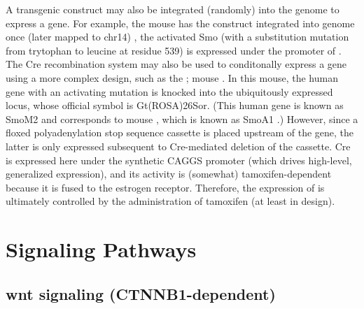 A transgenic construct may also be integrated (randomly) into the genome to express a gene. For example, the  mouse has the  construct integrated into genome once (later mapped to chr14) , the activated Smo (with a substitution mutation from trytophan to leucine at residue 539) is expressed under the promoter of . The Cre recombination system may also be used to conditonally express a gene using a more complex design, such as the ; mouse . In this mouse, the human  gene with an activating  mutation is knocked into the ubiquitously expressed  locus, whose official symbol is Gt(ROSA)26Sor. (This human  gene is known as SmoM2  and corresponds to mouse , which is known as SmoA1 .) However, since a floxed polyadenylation stop sequence cassette is placed upstream of the  gene, the latter is only expressed subsequent to Cre-mediated deletion of the cassette. Cre is expressed here under the synthetic CAGGS promoter (which drives high-level, generalized expression), and its activity is (somewhat) tamoxifen-dependent because it is fused to the estrogen receptor. Therefore, the expression of  is ultimately controlled by the administration of tamoxifen (at least in design).


\section{Signaling Pathways}
\label{sec:signal-pathways}

\subsection{\gls{wnt} signaling (CTNNB1-dependent)}

